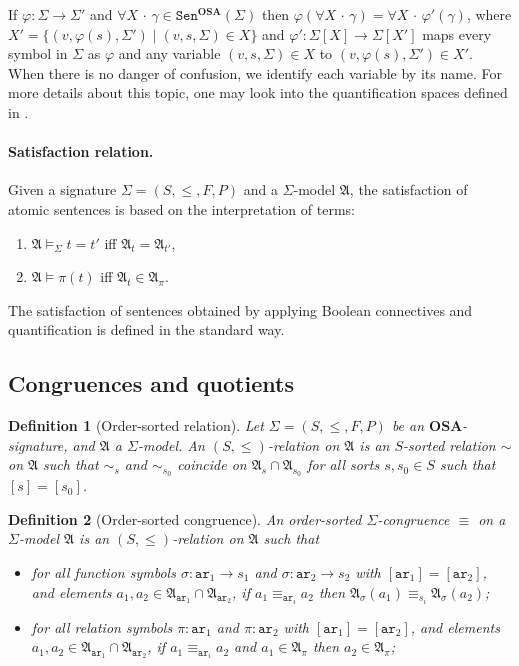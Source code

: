 \documentclass{article}
\newtheorem{definition}{Definition}
\newcommand{\OSA}{{\mathbf{OSA}}}
\newcommand{\Sen}{\mathtt{Sen}}
\newcommand{\A}{\mathfrak{A}}
\newcommand{\ari}{\mathtt{ar}}
\newcommand{\Forall}[1]{\forall #1\,{\cdot}\,}
\begin{document}
If $\varphi\colon\Sigma\to \Sigma'$ and $\Forall{X}\gamma\in \Sen^\OSA(\Sigma)$ then $\varphi(\Forall{X}\gamma)=\Forall{X}\varphi'(\gamma)$, where $X'=\{(v,\varphi(s),\Sigma')\mid (v,s,\Sigma)\in X\}$ and $\varphi':\Sigma[X]\to\Sigma[X']$ maps every symbol in $\Sigma$ as $\varphi$ and any variable $(v,s,\Sigma)\in X$ to $(v,\varphi(s),\Sigma')\in X'$.
When there is no danger of confusion, we identify each variable by its name.
For more details about this topic, one may look into the quantification spaces defined in \cite{dia-qvh}.


\paragraph{Satisfaction relation.}
Given a signature $\Sigma=(S,\leq,F,P)$ and a $\Sigma$-model $\A$, the satisfaction of atomic sentences is based on the interpretation of terms:
\begin{enumerate}
\item $\A\models_\Sigma t=t'$ iff $\A_t= \A_{t'}$,

\item $\A\models\pi(t)$ iff $\A_t\in \A_\pi$.
\end{enumerate}
The satisfaction of sentences obtained by applying Boolean connectives and quantification is defined in the standard way.

\subsection{Congruences and quotients}

\begin{definition}[Order-sorted relation]
  Let \(\Sigma = (S, \leq, F, P)\) be an \(\OSA\)-signature, and \( \A \) a \(\Sigma\)-model.
  An $(S,\leq)$-relation on \(\A\) is an \(S\)-sorted relation \(\sim\) on \(\A\) such that \(\sim_{s}\) and \(\sim_{s_0}\) coincide on \(\A_{s} \cap \A_{s_0}\) for all sorts \(s, s_0 \in S\) such that \([s] = [s_0]\).

\end{definition}

\begin{definition}[Order-sorted congruence]
  An order-sorted $\Sigma$-congruence $\equiv$ on a \(\Sigma\)-model \(\A\) is an $(S,\leq)$-relation on $\A$ such that
  \begin{itemize}
    \item for all function symbols \(\sigma \colon \ari_{1} \to s_{1}\) and \(\sigma \colon \ari_{2} \to s_{2}\) with \([\ari_{1}] = [\ari_{2}]\), and elements \(a_{1}, a_{2} \in \A_{\ari_{1}} \cap \A_{\ari_{2}}\), if \(a_{1} \equiv_{\ari_{i}} a_{2}\) then \(\A_{\sigma}(a_{1}) \equiv_{s_{i}} \A_{\sigma}(a_{2})\);

    \item for all relation symbols \(\pi \colon \ari_{1}\) and \(\pi \colon \ari_{2}\) with \([\ari_{1}] = [\ari_{2}]\), and elements \(a_{1}, a_{2} \in \A_{\ari_{1}} \cap \A_{\ari_{2}}\), if \(a_{1} \equiv_{\ari_{i}} a_{2}\) and \(a_{1} \in \A_{\pi}\) then \(a_{2} \in \A_{\pi}\);
    \end{itemize}
\end{definition}
\end{document}
